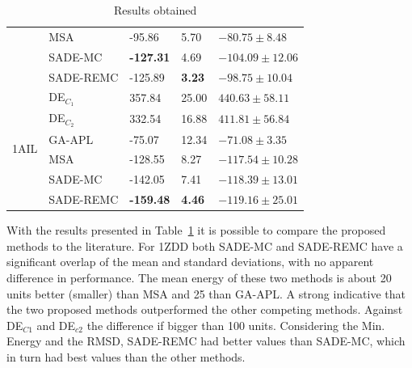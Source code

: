 \begin{table}[ht!]
\begin{tabular}{ l | l | l | l | l }
                     & MSA          & -95.86              & 5.70              & $-80.75\pm8.48$           \\ \cline{2-5}
                     & SADE-MC      & \textbf{-127.31}    & 4.69              & $\bm{-104.09 \pm 12.06}$  \\ \cline{2-5}
                     & SADE-REMC    & -125.89             & \textbf{3.23}     & $-98.75 \pm 10.04$        \\ \hline \hline
\multirow{6}{*}{1AIL}& DE$_{C_1}   $& 357.84              & 25.00             & $440.63\pm58.11    $      \\ \cline{2-5}
                     & DE$_{C_2}   $& 332.54              & 16.88             & $411.81\pm56.84    $      \\ \cline{2-5}
                     & GA-APL       & -75.07              & 12.34             & $-71.08\pm3.35$           \\ \cline{2-5}
                     & MSA          & -128.55             & 8.27              & $-117.54\pm10.28$         \\ \cline{2-5}
                     & SADE-MC      & -142.05             & 7.41              & $-118.39 \pm 13.01$       \\ \cline{2-5}
                     & SADE-REMC    & \textbf{-159.48}    & \textbf{4.46}     & $\bm{-119.16 \pm 25.01}$  \\ \hline \hline
  \end{tabular}
  \caption{Results obtained}
  \label{tab:literature-compatison}
\end{table}

With the results presented in Table~\ref{tab:literature-compatison} it is possible to compare the proposed methods to the literature.
For 1ZDD both SADE-MC and SADE-REMC have a significant overlap of the mean and standard deviations, with
no apparent difference in performance. The mean energy of these two methods is about 20 units
better (smaller) than MSA and 25 than GA-APL. A strong indicative that the two proposed methods outperformed
the other competing methods. Against DE$_{C1}$ and DE$_{c2}$ the difference if bigger than 100 units.
Considering the Min. Energy and the RMSD, SADE-REMC had better values than SADE-MC, which in turn had
best values than the other methods.


